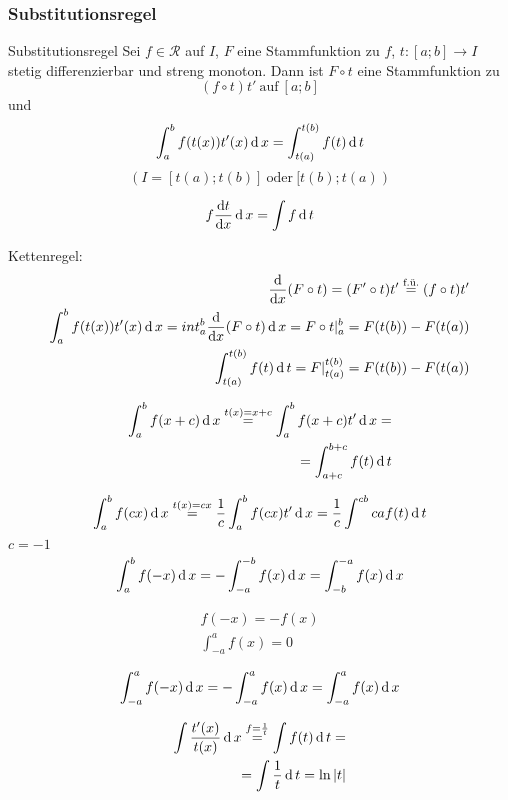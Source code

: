 \subsubsection{Substitutionsregel}
\begin{Sat}{Substitutionsregel}
  Sei $f\in\mathcal{R}$ auf $I$, $F$ eine Stammfunktion zu $f$, $t:[a;b]\to I$ stetig differenzierbar und streng monoton. Dann ist $F\circ t$ eine Stammfunktion zu
  \[(f\circ t)t'\ \text{auf}\ [a;b]\]
  und
  \[\int^b_af(t(x))t'(x)\operatorname{d} x=\int^{t(b)}_{t(a)}f(t)\operatorname{d} t\]
  \[(I=[t(a);t(b)]\ \text{oder}\ [t(b);t(a))\]
\end{Sat}
\begin{Not}
  \[f\displaystyle\frac{\mathrm{d}t}{\mathrm{d}x}\operatorname{d} x=\int f\operatorname{d} t\]
\end{Not}
\begin{Bew}
  Kettenregel:
  \begin{align*}
    \displaystyle\frac{\mathrm{d}}{\mathrm{d}x}(F\circ t)=(F'\circ t)t'\stackrel{\text{f.ü.}}{=}(f\circ t)t'\\
    \int^b_af(t(x))t'(x)\operatorname{d} x=int^b_a\displaystyle\frac{\mathrm{d}}{\mathrm{d}x}(F\circ t)\operatorname{d} x=F\circ t|^b_a=F(t(b))-F(t(a))\\
    \int^{t(b)}_{t(a)}f(t)\operatorname{d} t=F|^{t(b)}_{t(a)}=F(t(b))-F(t(a))
  \end{align*}
\end{Bew}
\begin{Bsp}
  \begin{align*}
    \int^b_af(x+c)\operatorname{d} x\stackrel{t(x)=x+c}{=}\int^b_af(x+c)t'\operatorname{d} x=\\
    =\int^{b+c}_{a+c}f(t)\operatorname{d} t
  \end{align*}
\end{Bsp}
\begin{Bsp}
  \begin{align*}
    \int^b_af(cx)\operatorname{d} x\stackrel{t(x)=cx}{=}\frac{1}{c}\int^b_af(cx)t'\operatorname{d} x=\frac{1}{c}\int^{cb}{ca}f(t)\operatorname{d} t
  \end{align*}
  $c=-1$
  \begin{align*}
    \int^b_af(-x)\operatorname{d} x=-\int^{-b}_{-a}f(x)\operatorname{d} x=\int^{-a}_{-b}f(x)\operatorname{d} x
  \end{align*}
\end{Bsp}
\begin{Kor}
  \begin{align*}
    f(-x)=-f(x)\\
    \int^a_{-a}f(x)=0
  \end{align*}
\end{Kor}
\begin{Bew}
  \begin{align*}
    \int^a_{-a}f(-x)\operatorname{d} x=-\int^a_{-a}f(x)\operatorname{d} x=\int^a_{-a}f(x)\operatorname{d} x
  \end{align*}
\end{Bew}
\begin{Bsp}
  \begin{align*}
    \int\frac{t'(x)}{t(x)}\operatorname{d} x\stackrel{f=\frac{1}{t}}{=}\int f(t)\operatorname{d} t=\\
    =\int\frac{1}{t}\operatorname{d} t=\ln\left| t \right|
  \end{align*}
\end{Bsp}
